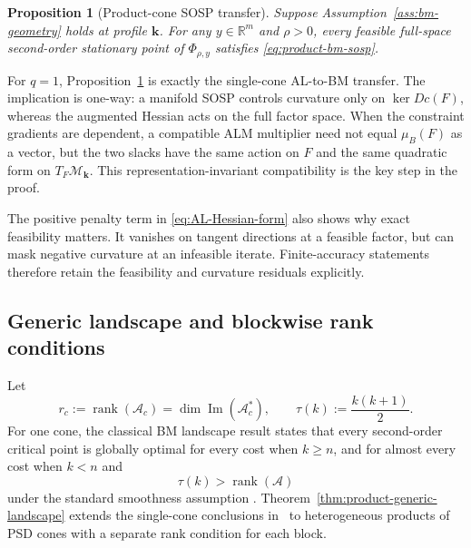 \documentclass[11pt]{article}
\newtheorem{proposition}{Proposition}
\theoremstyle{definition}
\theoremstyle{remark}
\begin{document}
\begin{proposition}[Product-cone SOSP transfer]
\label{prop:product-sosp-transfer}
Suppose Assumption~\ref{ass:bm-geometry} holds at profile $\mathbf k$.
For any $y\in\mathbb R^m$ and $\rho>0$, every feasible full-space
second-order stationary point of $\Phi_{\rho,y}$ satisfies
\eqref{eq:product-bm-sosp}.
\end{proposition}

For $q=1$, Proposition~\ref{prop:product-sosp-transfer} is exactly the
single-cone AL-to-BM transfer.  The implication is one-way: a manifold SOSP
controls curvature only on $\ker Dc(F)$, whereas the augmented Hessian acts
on the full factor space.  When the constraint gradients are dependent, a
compatible ALM multiplier need not equal $\mu_B(F)$ as a vector, but the two
slacks have the same action on $F$ and the same quadratic form on
$T_F\mathcal M_{\mathbf k}$.  This representation-invariant compatibility is
the key step in the proof.

The positive penalty term in \eqref{eq:AL-Hessian-form} also shows why exact
feasibility matters.  It vanishes on tangent directions at a feasible factor,
but can mask negative curvature at an infeasible iterate.  Finite-accuracy
statements therefore retain the feasibility and curvature residuals
explicitly.

\subsection{Generic landscape and blockwise rank conditions}
\label{subsec:product-landscape}

Let
\begin{equation}
  r_c:=\operatorname{rank}(\mathcal A_c)
      =\dim\operatorname{Im}(\mathcal A_c^*),
  \qquad
  \tau(k):=\frac{k(k+1)}2.
  \label{eq:block-affine-dimension}
\end{equation}
For one cone, the classical BM landscape result states that every
second-order critical point is globally optimal for every cost when
$k\geq n$, and for almost every cost when $k<n$ and
\begin{equation}
  \tau(k)>\operatorname{rank}(\mathcal A)
  \label{eq:bvb-rank-threshold}
\end{equation}
under the standard smoothness assumption
\cite[Proposition~3.1, Corollary~3.2, and Lemma~3.3]{BVB2020}.
Theorem~\ref{thm:product-generic-landscape} extends the single-cone conclusions
in~\cite[Theorem~1.4]{BVB2020} to heterogeneous products of PSD cones with a
separate rank condition for each block.
\end{document}
